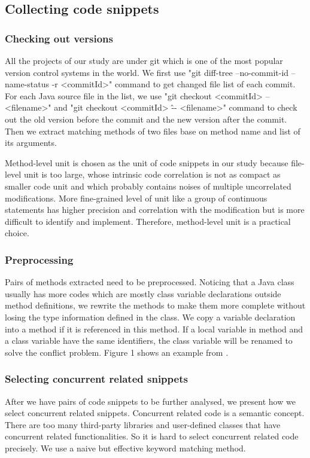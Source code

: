 \documentclass{sig-alternate-05-2015}
\begin{document}
\subsection{Collecting code snippets}
\subsubsection{Checking out versions}
All the projects of our study are under git which is one of the most popular version control systems in the world. We first use "git diff-tree --no-commit-id --name-status -r <commitId>" command to get changed file list of each commit. For each Java source file in the list, we use "git checkout <commitId> -- <filename>" and "git checkout <commitId> \^ -- <filename>" command to check out the old version before the commit and the new version after the commit. Then we extract matching methods of two files base on method name and list of its arguments.

Method-level unit is chosen as the unit of code snippets in our study because file-level unit is too large, whose intrinsic code correlation is not as compact as smaller code unit and which probably contains noises of multiple uncorrelated modifications. More fine-grained level of unit like a group of continuous statements has higher precision and correlation with the modification but is more difficult to identify and implement. Therefore, method-level unit is a practical choice. 

\subsubsection{Preprocessing}
Pairs of methods extracted need to be preprocessed. Noticing that a Java class usually has more codes which are mostly class variable declarations outside method definitions, we rewrite the methods to make them more complete without losing the type information defined in the class. We copy a variable declaration into a method if it is referenced in this method. If a local variable in method and a class variable have the same identifiers, the class variable will be renamed to solve the conflict problem. Figure 1 shows an example from .

\subsubsection{Selecting concurrent related snippets}
After we have pairs of code snippets to be further analysed, we present how we select concurrent related snippets. Concurrent related code is a semantic concept. There are too many third-party libraries and user-defined classes that have concurrent related functionalities. So it is hard to select concurrent related code precisely. We use a naive but effective keyword matching method.
\end{document}
